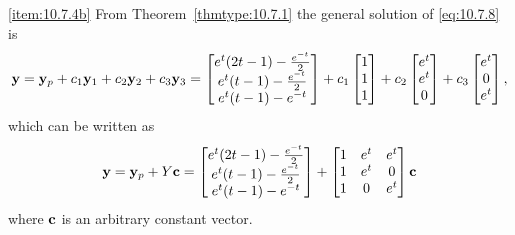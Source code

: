 \documentclass{ximera}
\begin{document}
\begin{example}
\begin{explanation}
\ref{item:10.7.4b}
From Theorem~\ref{thmtype:10.7.1} the general solution of
\eqref{eq:10.7.8} is
$$
{\bf y}={\bf y}_p+c_1{\bf y}_1+c_2{\bf y}_2+c_3{\bf y}_3=
\begin{bmatrix}e^t(2t-1)-\frac{e^{-t}}{2}\\
e^t(t-1)-\frac{e^{-t}}{2}\\
e^t(t-1)-e^{-t}\end{bmatrix}+
c_1\begin{bmatrix}1\\1\\1\end{bmatrix}+
c_2\begin{bmatrix}e^t\\e^t\\0\end{bmatrix}
+c_3\begin{bmatrix}e^t\\0\\e^t\end{bmatrix},
$$
which can  be written as
$$
{\bf y}={\bf y}_p+Y{\bf c}=
\begin{bmatrix}e^t(2t-1)-\frac{e^{-t}}{2}\\
e^t(t-1)-\frac{e^{-t}}{2}\\
e^t(t-1)-e^{-t} \end{bmatrix}+
\begin{bmatrix}1&e^t&e^t\\1&e^t&0\\1&0&e^t\end{bmatrix}{\bf c}
$$
where ${\bf c}$ is an arbitrary constant vector.
\end{explanation}
\end{example}
\end{document}

